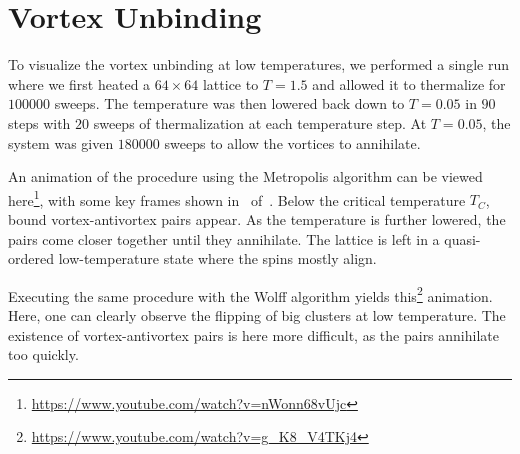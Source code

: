 \section{Vortex Unbinding}\label{sec:vortex_unbinding}
	To visualize the vortex unbinding at low temperatures, we performed a single run where we first heated a $64 \times 64$ lattice  to $T = \num{1.5}$ and allowed it to thermalize for $\num{100 000}$ sweeps. The temperature was then lowered back down to $T = \num{0.05}$ in $90$ steps with $20$ sweeps of thermalization at each temperature step. At $T = \num{0.05}$, the system was given $\num{180 000}$ sweeps to allow the vortices to annihilate.
	
	An animation of the procedure using the Metropolis algorithm can be viewed here\footnote{\url{https://www.youtube.com/watch?v=nWonn68vUjc}}, with some key frames shown in~ of~. Below the critical temperature $T_C$, bound vortex-antivortex pairs appear. As the temperature is further lowered, the pairs come closer together until they annihilate. The lattice is left in a quasi-ordered low-temperature state where the spins mostly align.
	
	Executing the same procedure with the Wolff algorithm yields this\footnote{\url{https://www.youtube.com/watch?v=g_K8_V4TKj4}} animation. Here, one can clearly observe the flipping of big clusters at low temperature. The existence of vortex-antivortex pairs is here more difficult, as the pairs annihilate too quickly. 